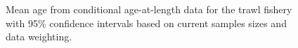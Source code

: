 \documentclass[
]{scrartcl}
\begin{document}
\begin{figure}[H]


\caption{\label{fig-trawl-mean-caal}Mean age from conditional
age-at-length data for the trawl fishery with 95\% confidence intervals
based on current samples sizes and data weighting.}

\end{figure}%
\end{document}
